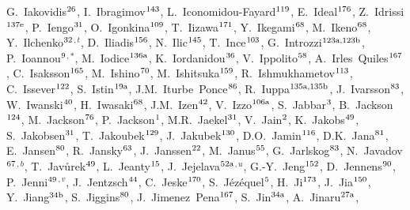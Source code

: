 \begin{flushleft}
G.~Iakovidis$^\textrm{\scriptsize 26}$,
I.~Ibragimov$^\textrm{\scriptsize 143}$,
L.~Iconomidou-Fayard$^\textrm{\scriptsize 119}$,
E.~Ideal$^\textrm{\scriptsize 176}$,
Z.~Idrissi$^\textrm{\scriptsize 137e}$,
P.~Iengo$^\textrm{\scriptsize 31}$,
O.~Igonkina$^\textrm{\scriptsize 109}$,
T.~Iizawa$^\textrm{\scriptsize 171}$,
Y.~Ikegami$^\textrm{\scriptsize 68}$,
M.~Ikeno$^\textrm{\scriptsize 68}$,
Y.~Ilchenko$^\textrm{\scriptsize 32}$$^{,t}$,
D.~Iliadis$^\textrm{\scriptsize 156}$,
N.~Ilic$^\textrm{\scriptsize 145}$,
T.~Ince$^\textrm{\scriptsize 103}$,
G.~Introzzi$^\textrm{\scriptsize 123a,123b}$,
P.~Ioannou$^\textrm{\scriptsize 9}$$^{,*}$,
M.~Iodice$^\textrm{\scriptsize 136a}$,
K.~Iordanidou$^\textrm{\scriptsize 36}$,
V.~Ippolito$^\textrm{\scriptsize 58}$,
A.~Irles~Quiles$^\textrm{\scriptsize 167}$,
C.~Isaksson$^\textrm{\scriptsize 165}$,
M.~Ishino$^\textrm{\scriptsize 70}$,
M.~Ishitsuka$^\textrm{\scriptsize 159}$,
R.~Ishmukhametov$^\textrm{\scriptsize 113}$,
C.~Issever$^\textrm{\scriptsize 122}$,
S.~Istin$^\textrm{\scriptsize 19a}$,
J.M.~Iturbe~Ponce$^\textrm{\scriptsize 86}$,
R.~Iuppa$^\textrm{\scriptsize 135a,135b}$,
J.~Ivarsson$^\textrm{\scriptsize 83}$,
W.~Iwanski$^\textrm{\scriptsize 40}$,
H.~Iwasaki$^\textrm{\scriptsize 68}$,
J.M.~Izen$^\textrm{\scriptsize 42}$,
V.~Izzo$^\textrm{\scriptsize 106a}$,
S.~Jabbar$^\textrm{\scriptsize 3}$,
B.~Jackson$^\textrm{\scriptsize 124}$,
M.~Jackson$^\textrm{\scriptsize 76}$,
P.~Jackson$^\textrm{\scriptsize 1}$,
M.R.~Jaekel$^\textrm{\scriptsize 31}$,
V.~Jain$^\textrm{\scriptsize 2}$,
K.~Jakobs$^\textrm{\scriptsize 49}$,
S.~Jakobsen$^\textrm{\scriptsize 31}$,
T.~Jakoubek$^\textrm{\scriptsize 129}$,
J.~Jakubek$^\textrm{\scriptsize 130}$,
D.O.~Jamin$^\textrm{\scriptsize 116}$,
D.K.~Jana$^\textrm{\scriptsize 81}$,
E.~Jansen$^\textrm{\scriptsize 80}$,
R.~Jansky$^\textrm{\scriptsize 63}$,
J.~Janssen$^\textrm{\scriptsize 22}$,
M.~Janus$^\textrm{\scriptsize 55}$,
G.~Jarlskog$^\textrm{\scriptsize 83}$,
N.~Javadov$^\textrm{\scriptsize 67}$$^{,b}$,
T.~Jav\r{u}rek$^\textrm{\scriptsize 49}$,
L.~Jeanty$^\textrm{\scriptsize 15}$,
J.~Jejelava$^\textrm{\scriptsize 52a}$$^{,u}$,
G.-Y.~Jeng$^\textrm{\scriptsize 152}$,
D.~Jennens$^\textrm{\scriptsize 90}$,
P.~Jenni$^\textrm{\scriptsize 49}$$^{,v}$,
J.~Jentzsch$^\textrm{\scriptsize 44}$,
C.~Jeske$^\textrm{\scriptsize 170}$,
S.~J\'ez\'equel$^\textrm{\scriptsize 5}$,
H.~Ji$^\textrm{\scriptsize 173}$,
J.~Jia$^\textrm{\scriptsize 150}$,
Y.~Jiang$^\textrm{\scriptsize 34b}$,
S.~Jiggins$^\textrm{\scriptsize 80}$,
J.~Jimenez~Pena$^\textrm{\scriptsize 167}$,
S.~Jin$^\textrm{\scriptsize 34a}$,
A.~Jinaru$^\textrm{\scriptsize 27a}$,
$$
\end{flushleft}
